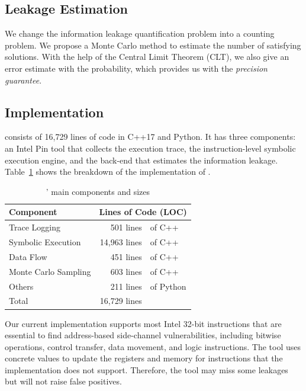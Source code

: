 \subsection{Leakage Estimation} 
We change the information leakage quantification problem into a counting problem. We propose a
Monte Carlo method to estimate the number of satisfying solutions. With the help of the Central Limit Theorem (CLT), we also give an error
estimate with the probability, which provides us with the \emph{precision guarantee}.

\subsection{Implementation}

\tool{} consists of 16,729 lines of code in C++17 and Python. It has three components: an Intel Pin tool that collects the execution trace, the
instruction-level symbolic execution engine, and the back-end that estimates the information leakage. Table~\ref{tbl:implementation} shows the breakdown of the implementation of \tool{}.

\begin{table}[ht]
    \centering\normalsize
    \caption{\tool{}' main components and sizes}\label{tbl:implementation}
    \begin{tabular}{lr@{~}l}
        \hline
        Component            & \multicolumn{2}{c}{Lines of Code (LOC)}             \\ \hline
        Trace Logging        & 501 lines                               & of C++    \\
        Symbolic Execution   & 14,963 lines                            & of C++    \\
        Data Flow            & 451 lines                               & of C++    \\
        Monte Carlo Sampling & 603 lines                               & of C++    \\
        Others               & 211 lines                               & of Python \\ \hline
        Total                & 16,729 lines                            &           \\\hline
    \end{tabular}
\end{table}

Our current implementation supports most Intel 32-bit instructions that are essential to find address-based side-channel vulnerabilities, including bitwise operations, control transfer, data movement, and logic instructions. The tool uses concrete values to update the registers and memory for instructions that the implementation does not support. Therefore, the tool may miss some leakages but will not raise false positives.

